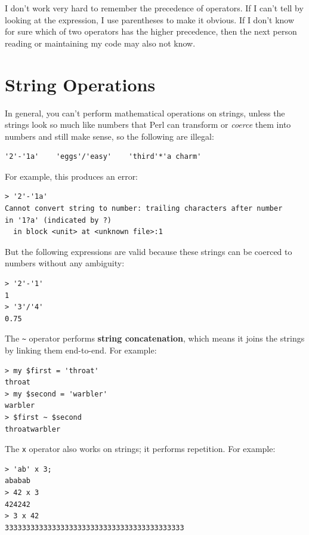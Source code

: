 I don't work very hard to remember the precedence of
operators.  If I can't tell by looking at the expression, I use
parentheses to make it obvious. If I don't know for sure which of two operators 
has the higher precedence, then the next person reading or maintaining 
my code may also not know.


\section{String Operations}
\label{string_operations}

In general, you can't perform mathematical operations on strings, unless
the strings look so much like numbers that Perl can transform or \emph{coerce} them into numbers and still make sense, so the 
following are illegal:

\begin{verbatim}
'2'-'1a'    'eggs'/'easy'    'third'*'a charm'
\end{verbatim}
%

For example, this produces an error:

\begin{verbatim}
> '2'-'1a'
Cannot convert string to number: trailing characters after number 
in '1?a' (indicated by ?)
  in block <unit> at <unknown file>:1
\end{verbatim}
%
  
But the following expressions are valid because these strings 
can be coerced to numbers without any ambiguity:
\begin{verbatim}
> '2'-'1'
1
> '3'/'4'
0.75
\end{verbatim}
%

The \verb'~' operator performs {\bf string concatenation}, which means
it joins the strings by linking them end-to-end.  For example:

\begin{verbatim}
> my $first = 'throat'
throat
> my $second = 'warbler'
warbler
> $first ~ $second
throatwarbler
\end{verbatim}
%
The {\tt x} operator also works on strings; it performs repetition.
For example:

\begin{verbatim}
> 'ab' x 3;
ababab
> 42 x 3
424242
> 3 x 42
333333333333333333333333333333333333333333
\end{verbatim}

